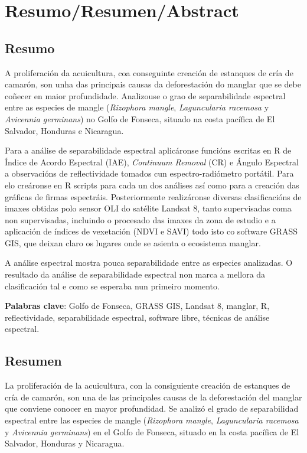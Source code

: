 
\chapter*{Resumo/Resumen/Abstract}
\section*{Resumo}
A proliferación da acuicultura, coa conseguinte creación de estanques de cría de camarón, son unha das principais causas da deforestación do manglar que se debe coñecer en maior profundidade. Analizouse o grao de separabilidade espectral entre as especies de mangle (\textit{Rizophora mangle}, \textit{Laguncularia racemosa} y \textit{Avicennia germinans}) no Golfo de Fonseca, situado na costa pacífica de El Salvador, Honduras e Nicaragua.

Para a análise de separabilidade espectral aplicáronse funcións escritas en R de Índice de Acordo Espectral (IAE), \textit{Continuum Removal} (CR) e Ángulo Espectral a observacións de reflectividade tomados cun espectro-radiómetro portátil. Para elo creáronse en R scripts para cada un dos análises así como para a creación das gráficas de firmas espectráis. Posteriormente realizáronse diversas clasificacións de imaxes obtidas polo sensor OLI do satélite Landsat 8, tanto supervisadas coma non supervisadas, incluindo o procesado das imaxes da zona de estudio e a aplicación de índices de vexetación (NDVI e SAVI) todo isto co software GRASS GIS, que deixan claro os lugares onde se asienta o ecosistema manglar.

A análise espectral mostra pouca separabilidade entre as especies analizadas. O resultado da análise de separabilidade espectral non marca a mellora da clasificación tal e como se esperaba nun primeiro momento.

\noindent\textbf{Palabras clave}: Golfo de Fonseca, GRASS GIS, Landsat 8, manglar, R, reflectividade, separabilidade espectral, software libre, técnicas de análise espectral.

\section*{Resumen}
La proliferación de la acuicultura, con la consiguiente creación de estanques de cría de camarón, son una de las principales causas de la deforestación del manglar que conviene conocer en mayor profundidad. Se analizó el grado de separabilidad espectral entre las especies de mangle (\textit{Rizophora mangle}, \textit{Laguncularia racemosa} y \textit{Avicennia germinans}) en el Golfo de Fonseca, situado en la costa pacífica de El Salvador, Honduras y Nicaragua.

